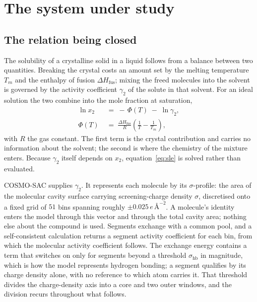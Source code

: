 \section{The system under study}
\label{sec:system}

\subsection{The relation being closed}

The solubility of a crystalline solid in a liquid follows from a balance between two quantities.
Breaking the crystal costs an amount set by the melting temperature $T_m$ and the enthalpy of
fusion $\Delta H_{\mathrm{fus}}$; mixing the freed molecules into the solvent is governed by the
activity coefficient $\gamma_2$ of the solute in that solvent. For an ideal solution the two
combine into the mole fraction at saturation,
%
\begin{equation}
\begin{aligned}
\ln x_2 &\;=\; -\,\Phi(T) \;-\; \ln \gamma_2 , \\[2pt]
\Phi(T) &\;=\; \frac{\Delta H_{\mathrm{fus}}}{R}
          \left(\frac{1}{T} - \frac{1}{T_m}\right),
\end{aligned}
\label{eq:sle}
\end{equation}
%
with $R$ the gas constant. The first term is the crystal contribution and carries no information
about the solvent; the second is where the chemistry of the mixture enters. Because $\gamma_2$
itself depends on $x_2$, equation~\eqref{eq:sle} is solved rather than evaluated.

COSMO-SAC \cite{lin2002} supplies $\gamma_2$. It represents each molecule by its $\sigma$-profile:
the area of the molecular cavity surface carrying screening-charge density $\sigma$, discretised
onto a fixed grid of $51$ bins spanning roughly $\pm 0.025\,e\,\text{\AA}^{-2}$. A molecule's
identity enters the model through this vector and through the total cavity area; nothing else about
the compound is used. Segments exchange with a common pool, and a self-consistent calculation
returns a segment activity coefficient for each bin, from which the molecular activity coefficient
follows. The exchange energy contains a term that switches on only for segments beyond a threshold
$\sigma_{\mathrm{hb}}$ in magnitude, which is how the model represents hydrogen bonding; a segment
qualifies by its charge density alone, with no reference to which atom carries it. That threshold
divides the charge-density axis into a core and two outer windows, and the division recurs
throughout what follows.


